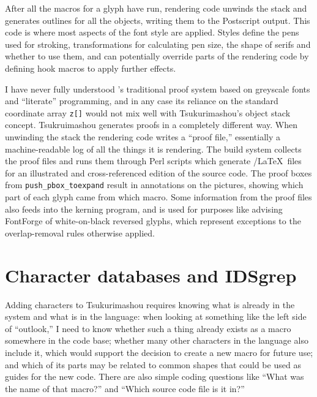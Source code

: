 \documentclass{ltugboat}
\begin{document}
After all the macros for a glyph have run, rendering code unwinds the stack
and generates outlines for all the objects, writing them to the Postscript
output.  This code is where most aspects of the font style are applied. 
Styles define the pens used for stroking, transformations for calculating
pen size, the shape of serifs and whether to use them, and can potentially
override parts of the rendering code by defining hook macros to apply
further effects.

I have never fully understood \MF's traditional proof system based on
greyscale fonts and ``literate'' programming, and in any case its reliance
on the standard coordinate array \verb|z[]| would not mix well with
Tsukurimashou's object stack concept.  Tsukruimashou generates proofs in a
completely different way.  When unwinding the stack the rendering code
writes a ``proof file,'' essentially a machine-readable log of all the
things it is rendering.  The build system collects the proof files and runs
them through Perl scripts which generate \TikZ/\LaTeX\ files for an
illustrated and cross-referenced edition of the source code.  The proof
boxes from \verb|push_pbox_toexpand| result in annotations on the pictures,
showing which part of each glyph came from which macro.  Some information
from the proof files also feeds into the kerning program, and is used for
purposes like advising FontForge of white-on-black reversed glyphs, which
represent exceptions to the overlap-removal rules otherwise
applied.


\section{Character databases and IDSgrep}

Adding characters to Tsukurimashou requires knowing what is already in the
system and what is in the language: when looking at something like the left
side of ``outlook,'' I need to know whether such a thing already exists as a
macro somewhere in the code base; whether many other characters in the
language also include it, which would support the decision to create a new
macro for future use; and which of its parts may be related to common shapes
that could be used as guides for the new code.  There are also simple coding
questions like ``What was the name of that macro?'' and ``Which source code
file is it in?''
\end{document}
